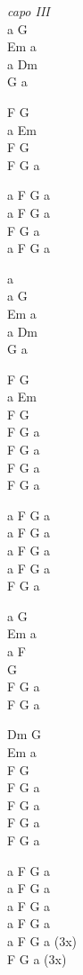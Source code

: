 \begin{chord}
\textit{capo III}\\
a G\\
Em a\\
a Dm\\
G a

F G\\
a Em\\
F G\\
F G a

a F G a\\
a F G a\\
F G a\\
a F G a

a\\
a G\\
Em a\\
a Dm\\
G a

F G\\
a  Em\\
F G\\
F G a\\
F G a\\
F G a\\
F G a

a F G a\\
a F G a\\
a F G a\\
a F G a\\
F G a

a G\\
Em a\\
a F\\
G\\
F G a\\
F G a

Dm G\\
Em a\\
F G\\
F G a\\
F G a\\
F G a\\
F G a

a F G a\\
a F G a\\
a F G a\\
a F G a\\
a F G a (3x)\\
F G a (3x)
\end{chord}
